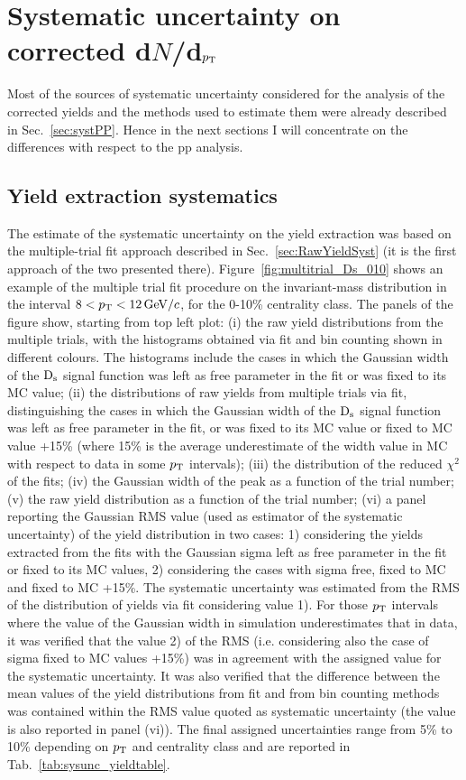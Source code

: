 \section{Systematic uncertainty on corrected d$N$/d$p_{\rm T}$}
\label{sec:systematics}
Most of the sources of systematic uncertainty considered for the analysis 
of the corrected yields and the methods used to estimate them were already described in Sec.~\ref{sec:systPP}. 
Hence in the next sections I will concentrate on the differences with respect to the 
pp analysis. 
\subsection{Yield extraction systematics}
\label{sec:YieldExsystAA}
The estimate of the systematic uncertainty on the yield extraction
was based on the multiple-trial fit approach described in Sec.~\ref{sec:RawYieldSyst}
(it is the first approach of the two presented there).
Figure~\ref{fig:multitrial_Ds_010} shows an example of the multiple trial fit procedure on the invariant-mass
distribution in the interval $8 < p_{\rm T} < 12 \, \mathrm{GeV}/c$, for the 0-10\% centrality class.
The panels of the figure show, starting from top left plot:
(i) the raw yield distributions from the multiple trials,
with the histograms obtained via fit and bin counting shown
in different colours. The histograms include the cases in which the Gaussian width of the ${\rm D_s}$ signal function was left as free parameter 
in the fit or was fixed to its MC value; (ii) the distributions of raw yields from multiple 
trials via fit, distinguishing the cases in which the Gaussian width of the ${\rm D_s}$ signal function was left as free parameter 
in the fit, or was fixed to its MC value or fixed to MC value +15\% (where
15\% is the average underestimate of the width value in MC with respect to data in some
$p_{\rm T}$ intervals);   
(iii) the distribution of the reduced $\chi^{2}$ of the fits; 
(iv) the Gaussian width of the peak as a function of the trial 
number; (v) the raw yield distribution as a 
function of the trial number; (vi) a panel reporting the Gaussian RMS value (used as
estimator of the systematic uncertainty) of the yield distribution
in two cases: 1) considering the yields extracted from the fits with 
the Gaussian sigma left as free parameter in the fit or fixed to its MC values, 2)
considering the cases with sigma free, fixed to MC and fixed to 
MC +15\%. The systematic uncertainty was estimated from the RMS
of the distribution of yields via fit considering value 1). For those $p_{\rm T}$ intervals where the value of the Gaussian width in 
simulation underestimates that in data, it was verified that
the value 2) of the RMS (i.e. considering also the case of sigma fixed to MC values +15\%) 
was in agreement with the assigned value for the systematic uncertainty.
It was also verified that the difference between the mean values of the yield distributions from fit
and from bin counting methods was contained within the RMS value quoted 
as systematic uncertainty (the value is also reported in panel (vi)).
The final assigned uncertainties range from 5\% to 10\% depending on $p_{\rm T}$ and
centrality class and are reported in Tab.~\ref{tab:sysunc_yieldtable}. 




